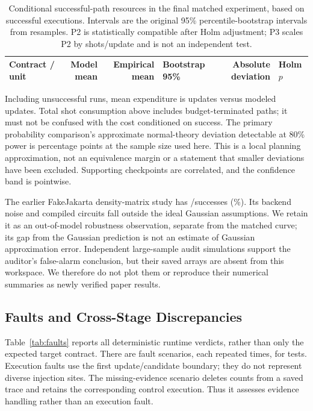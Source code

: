 \documentclass[conference]{IEEEtran}
\begin{document}
\begin{table}[!t]
\centering\footnotesize
\caption{Conditional successful-path resources in the final matched experiment, based on \SuccessRuns successful executions. Intervals are the original 95\% percentile-bootstrap intervals from \BootstrapSamples resamples. P2 is statistically compatible after Holm adjustment; P3 scales P2 by \ShotsPerUpdate shots/update and is not an independent test.}
\label{tab:conditional}
\begin{tabular}{@{}lrrlrl@{}}\toprule
Contract / unit & Model mean & Empirical mean & Bootstrap 95\% & Absolute deviation & Holm $p$ \\
\midrule


\end{tabular}
\end{table}

Including unsuccessful runs, mean expenditure is \UnconditionalEmpirical updates versus \UnconditionalModel modeled updates. Total shot consumption above includes budget-terminated paths; it must not be confused with the cost conditioned on success. The primary probability comparison's approximate normal-theory deviation detectable at 80\% power is \DetectablePP percentage points at the sample size used here. This is a local planning approximation, not an equivalence margin or a statement that smaller deviations have been excluded. Supporting checkpoints are correlated, and the confidence band is pointwise.

The earlier FakeJakarta density-matrix study has \NoisySuccess/\NoisyRuns successes (\NoisyPercent\%). Its backend noise and compiled circuits fall outside the ideal Gaussian assumptions. We retain it as an out-of-model robustness observation, separate from the matched curve; its gap from the Gaussian prediction is not an estimate of Gaussian approximation error. Independent large-sample audit simulations support the auditor's false-alarm conclusion, but their saved arrays are absent from this workspace. We therefore do not plot them or reproduce their numerical summaries as newly verified paper results.

\subsection{Faults and Cross-Stage Discrepancies}
\label{sec:faults}
Table~\ref{tab:faults} reports all deterministic runtime verdicts, rather than only the expected target contract. There are \FaultClasses fault scenarios, each repeated \FaultRepetitions times, for \FaultRuns tests. Execution faults use the first update/candidate boundary; they do not represent diverse injection sites. The missing-evidence scenario deletes counts from a saved trace and retains the corresponding control execution. Thus it assesses evidence handling rather than an execution fault.
\end{document}
